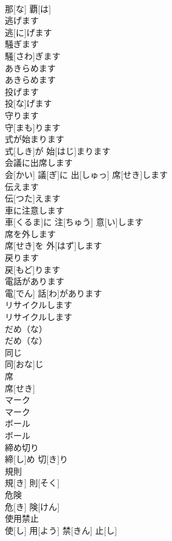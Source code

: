 \documentclass[8pt]{extreport}
\begin{document}
\begin{CJK}{UTF8}{min}
\\	那[な] 覇[は]		
\\	逃げます	
\\	逃[に]げます		
\\	騒ぎます	
\\	騒[さわ]ぎます		
\\	あきらめます	
\\	あきらめます		
\\	投げます	
\\	投[な]げます		
\\	守ります	
\\	守[まも]ります		
\\	式が始まります	
\\	式[しき]が 始[はじ]まります		
\\	会議に出席します	
\\	会[かい] 議[ぎ]に 出[しゅっ] 席[せき]します		
\\	伝えます	
\\	伝[つた]えます		
\\	車に注意します	
\\	車[くるま]に 注[ちゅう] 意[い]します		
\\	席を外します	
\\	席[せき]を 外[はず]します		
\\	戻ります	
\\	戻[もど]ります		
\\	電話があります	
\\	電[でん] 話[わ]があります		
\\	リサイクルします	
\\	リサイクルします		
\\	だめ（な）	
\\	だめ（な）		
\\	同じ	
\\	同[おな]じ		
\\	席	
\\	席[せき]		
\\	マーク	
\\	マーク		
\\	ボール	
\\	ボール		
\\	締め切り	
\\	締[し]め 切[き]り		
\\	規則	
\\	規[き] 則[そく]		
\\	危険	
\\	危[き] 険[けん]		
\\	使用禁止	
\\	使[し] 用[よう] 禁[きん] 止[し]		

\end{CJK}
\end{document}
